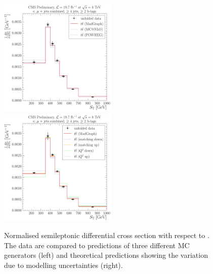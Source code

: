\begin{figure}[!htbp]
	\centering
  	{\includegraphics[width=0.5\textwidth]{measurement/ST/central/normalised_xsection_combined_different_generators}}\hfill
  	{\includegraphics[width=0.5\textwidth]{measurement/ST/central/normalised_xsection_combined_systematics_shifts}}
    \caption[Normalised semileptonic \ttbar differential cross section with respect to \ST]{Normalised semileptonic
      \ttbar differential cross section with respect to \ST. The data are compared to predictions of three different MC
      generators (left) and theoretical predictions showing the variation due to modelling uncertainties (right).}
    \label{fig:results_ST_combined}
\end{figure}

